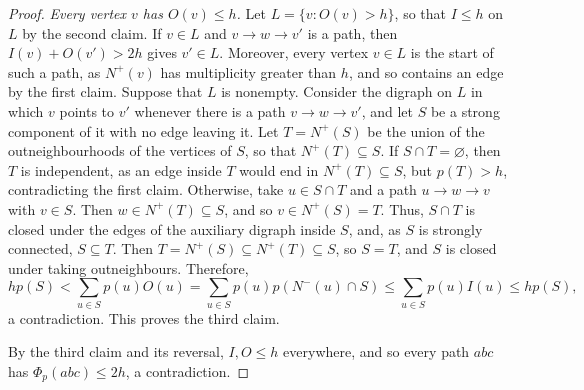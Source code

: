 \begin{proof}
\emph{Every vertex $v$ has $O(v)\le h$.}
Let $L=\{v:O(v)>h\}$, so that $I\le h$ on $L$ by the second claim.
If $v\in L$ and $v\to w\to v'$ is a path, then $I(v)+O(v')>2h$ gives $v'\in L$. Moreover, every vertex $v\in L$ is the start of such a path, as $N^+(v)$ has multiplicity greater than $h$, and so contains an edge by the first claim.
Suppose that $L$ is nonempty. Consider the digraph on $L$ in which $v$ points to $v'$ whenever there is a path $v\to w\to v'$, and let $S$ be a strong component of it with no edge leaving it. Let $T=N^+(S)$ be the union of the outneighbourhoods of the vertices of $S$, so that $N^+(T)\subseteq S$.
If $S\cap T=\varnothing$, then $T$ is independent, as an edge inside $T$ would end in $N^+(T)\subseteq S$, but $p(T)>h$, contradicting the first claim.
Otherwise, take $u\in S\cap T$ and a path $u\to w\to v$ with $v\in S$. Then $w\in N^+(T)\subseteq S$, and so $v\in N^+(S)=T$. Thus, $S\cap T$ is closed under the edges of the auxiliary digraph inside $S$, and, as $S$ is strongly connected, $S\subseteq T$. Then $T=N^+(S)\subseteq N^+(T)\subseteq S$, so $S=T$, and $S$ is closed under taking outneighbours. Therefore,
\[
 hp(S)<\sum_{u\in S}p(u)O(u)
 =\sum_{u\in S}p(u)p(N^-(u)\cap S)
 \le\sum_{u\in S}p(u)I(u)\le hp(S),
\]
a contradiction. This proves the third claim.

By the third claim and its reversal, $I,O\le h$ everywhere, and so every path $abc$ has $\Phi_p(abc)\le2h$, a contradiction.
\end{proof}

